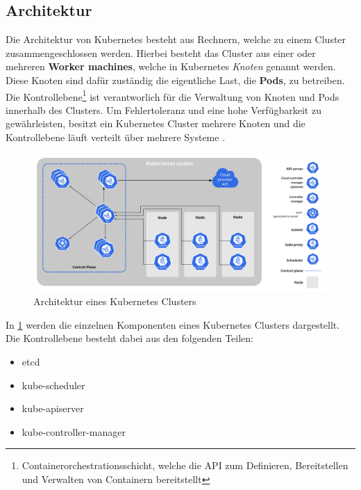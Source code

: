 \subsection{Architektur}
\label{subsec:kubernetes:architecture}
Die Architektur von Kubernetes besteht aus Rechnern, welche zu einem Cluster zusammengeschlossen werden.
Hierbei besteht das Cluster aus einer oder mehreren \textbf{Worker machines}, welche in Kubernetes \emph{Knoten}
genannt werden. Diese Knoten sind dafür zuständig die eigentliche Last, die \textbf{Pods}, zu betreiben.
Die Kontrollebene\footnote{Containerorchestrationsschicht, welche die API zum Definieren, Bereitstellen und Verwalten von Containern bereitstellt}
ist verantworlich für die Verwaltung von Knoten und Pods innerhalb des Clusters. 
Um Fehlertoleranz und eine hohe Verfügbarkeit zu gewährleisten, besitzt ein Kubernetes Cluster mehrere Knoten und
die Kontrollebene läuft verteilt über mehrere Systeme \cite{kubernetesComponents}. 

\begin{figure}
  \centering
  \includegraphics[width=1.2\textwidth]{gfx/chapters/2_grundlagen/components-of-kubernetes.pdf}
  \caption{Architektur eines Kubernetes Clusters}
  \label{fig:kubernetes_architecture}
\end{figure}

In \ref{fig:kubernetes_architecture} werden die einzelnen Komponenten eines Kubernetes Clusters dargestellt.
Die Kontrollebene besteht dabei aus den folgenden Teilen:
\begin{itemize}
  \item etcd
  \item kube-scheduler
  \item kube-apiserver
  \item kube-controller-manager
\end{itemize}

